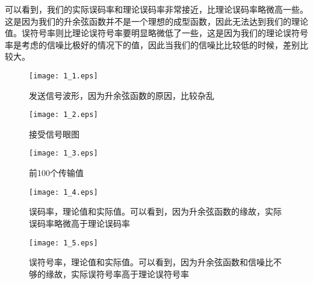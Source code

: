 \documentclass{article}
\begin{document}
可以看到，我们的实际误码率和理论误码率非常接近，比理论误码率略微高一些。这是因为我们的升余弦函数并不是一个理想的成型函数，因此无法达到我们的理论值。误符号率则比理论误符号率要明显略微低了一些，这是因为我们的理论误符号率是考虑的信噪比极好的情况下的值，因此当我们的信噪比比较低的时候，差别比较大。
\begin{figure}[!htb]
\begin{center}
		\texttt{[image: 1\_1.eps]}
		\caption{发送信号波形，因为升余弦函数的原因，比较杂乱}
\end{center}
\end{figure}
\begin{figure}[!htb]
\begin{center}
		\texttt{[image: 1\_2.eps]}
		\caption{接受信号眼图}
\end{center}
\end{figure}
\begin{figure}[!htb]
\begin{center}
		\texttt{[image: 1\_3.eps]}
		\caption{前100个传输值}
\end{center}
\end{figure}
\begin{figure}[!htb]
\begin{center}
		\texttt{[image: 1\_4.eps]}
		\caption{误码率，理论值和实际值。可以看到，因为升余弦函数的缘故，实际误码率略微高于理论误码率}
\end{center}
\end{figure}
\begin{figure}[!htb]
\begin{center}
		\texttt{[image: 1\_5.eps]}
		\caption{误符号率，理论值和实际值。可以看到，因为升余弦函数和信噪比不够的缘故，实际误符号率高于理论误符号率}
\end{center}
\end{figure}
\end{document}
